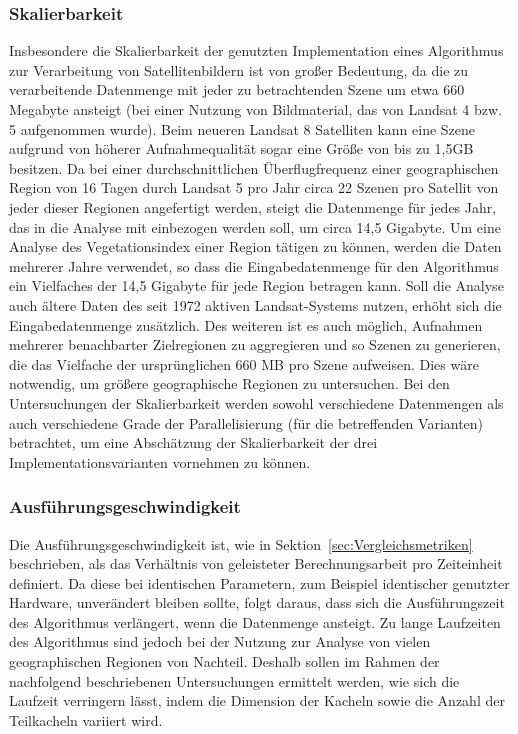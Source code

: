 \subsubsection{Skalierbarkeit}
Insbesondere die Skalierbarkeit der genutzten Implementation eines Algorithmus zur Verarbeitung von Satellitenbildern ist von großer Bedeutung, da die zu verarbeitende Datenmenge mit jeder zu betrachtenden Szene um etwa 660 Megabyte ansteigt (bei einer Nutzung von Bildmaterial, das von Landsat 4 bzw. 5 aufgenommen wurde). Beim neueren Landsat 8 Satelliten kann eine Szene aufgrund von höherer Aufnahmequalität sogar eine Größe von bis zu 1,5GB besitzen. Da bei einer durchschnittlichen Überflugfrequenz einer geographischen Region von 16 Tagen durch Landsat 5 pro Jahr circa 22 Szenen pro Satellit von jeder dieser Regionen angefertigt werden, steigt die Datenmenge für jedes Jahr, das in die Analyse mit einbezogen werden soll, um circa 14,5 Gigabyte. Um eine Analyse des Vegetationsindex einer Region tätigen zu können, werden die Daten mehrerer Jahre verwendet, so dass die Eingabedatenmenge für den Algorithmus ein Vielfaches der 14,5 Gigabyte für jede Region betragen kann. Soll die Analyse auch ältere Daten des seit 1972 aktiven Landsat-Systems nutzen, erhöht sich die Eingabedatenmenge zusätzlich. Des weiteren ist es auch möglich, Aufnahmen mehrerer benachbarter Zielregionen zu aggregieren und so Szenen zu generieren, die das Vielfache der ursprünglichen 660 MB pro Szene aufweisen. Dies wäre notwendig, um größere geographische Regionen zu untersuchen. 
Bei den Untersuchungen der Skalierbarkeit werden sowohl verschiedene Datenmengen als auch verschiedene Grade der Parallelisierung (für die betreffenden Varianten) betrachtet, um eine Abschätzung der Skalierbarkeit der drei Implementationsvarianten vornehmen zu können.

\subsubsection{Ausführungsgeschwindigkeit}
Die Ausführungsgeschwindigkeit ist, wie in Sektion~\ref{sec:Vergleichsmetriken} beschrieben, als das Verhältnis von geleisteter Berechnungsarbeit pro Zeiteinheit definiert. Da diese bei identischen Parametern, zum Beispiel identischer genutzter Hardware, unverändert bleiben sollte, folgt daraus, dass sich die Ausführungszeit des Algorithmus verlängert, wenn die Datenmenge ansteigt. Zu lange Laufzeiten des Algorithmus sind jedoch bei der Nutzung zur Analyse von vielen geographischen Regionen von Nachteil. Deshalb sollen im Rahmen der nachfolgend beschriebenen Untersuchungen ermittelt werden, wie sich die Laufzeit verringern lässt, indem die Dimension der Kacheln sowie die Anzahl der Teilkacheln variiert wird. 


